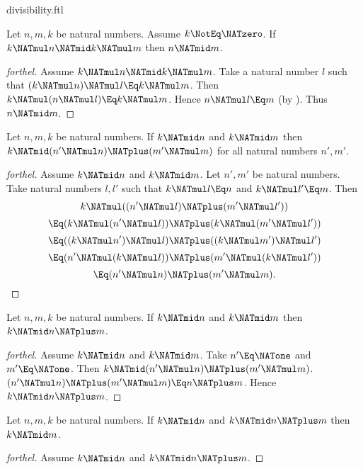 \documentclass{stex}
\begin{document}
\begin{smodule}{divisibility.ftl}
\begin{proposition}[forthel]
  Let $n, m, k$ be natural numbers.
  Assume $k \NotEq \NATzero$.
  If $k \NATmul n \NATmid k \NATmul m$ then $n \NATmid m$.
\end{proposition}
\begin{proof}[forthel]
  Assume $k \NATmul n \NATmid k \NATmul m$.
  Take a natural number $l$ such that $(k \NATmul n) \NATmul l \Eq k \NATmul m$.
  Then $k \NATmul (n \NATmul l) \Eq k \NATmul m$.
  Hence $n \NATmul l \Eq m$ (by ).
  Thus $n \NATmid m$.
\end{proof}

\begin{proposition}[forthel]
  Let $n, m, k$ be natural numbers.
  If $k \NATmid n$ and $k \NATmid m$ then $k \NATmid (n' \NATmul n) \NATplus (m' \NATmul m)$
  for all natural numbers $n', m'$.
\end{proposition}
\begin{proof}[forthel]
  Assume $k \NATmid n$ and $k \NATmid m$.
  Let $n', m'$ be natural numbers.
  Take natural numbers $l,l'$ such that $k \NATmul l \Eq n$ and $k \NATmul l' \Eq m$.
  Then
  \[  k \NATmul ((n' \NATmul l) \NATplus (m' \NATmul l'))                \]
  \[    \Eq (k \NATmul (n' \NATmul l)) \NATplus (k \NATmul (m' \NATmul l'))  \]
  \[    \Eq ((k \NATmul n') \NATmul l) \NATplus ((k \NATmul m') \NATmul l')  \]
  \[    \Eq (n' \NATmul (k \NATmul l)) \NATplus (m' \NATmul (k \NATmul l'))  \]
  \[    \Eq (n' \NATmul n) \NATplus (m' \NATmul m).                      \]
\end{proof}

\begin{corollary}[forthel]
  Let $n, m, k$ be natural numbers.
  If $k \NATmid n$ and $k \NATmid m$ then $k \NATmid n \NATplus m$.
\end{corollary}
\begin{proof}[forthel]
  Assume $k \NATmid n$ and $k \NATmid m$.
  Take $n' \Eq \NATone$ and $m' \Eq \NATone$.
  Then $k \NATmid (n' \NATmul n) \NATplus (m' \NATmul m)$.
  $(n' \NATmul n) \NATplus (m' \NATmul m) \Eq n \NATplus m$.
  Hence $k \NATmid n \NATplus m$.
\end{proof}


\begin{proposition}[forthel,name=divisibility of summands]
  Let $n, m, k$ be natural numbers.
  If $k \NATmid n$ and $k \NATmid n \NATplus m$ then $k \NATmid m$.
\end{proposition}
\begin{proof}[forthel]
  Assume $k \NATmid n$ and $k \NATmid n \NATplus m$.


\end{proof}
\end{smodule}
\end{document}
